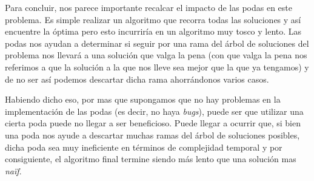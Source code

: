 Para concluir, nos parece importante recalcar el impacto de las podas en este problema. Es simple realizar un algoritmo que recorra todas las soluciones y así encuentre la óptima pero esto incurriría en un algoritmo muy tosco y lento. Las podas nos ayudan a determinar si seguir por una rama del árbol de soluciones del problema nos llevará a una solución que valga la pena (con que valga la pena nos referimos a que la solución a la que nos lleve sea mejor que la que ya tengamos) y de no ser así podemos descartar dicha rama ahorrándonos varios casos.

Habiendo dicho eso, por mas que supongamos que no hay problemas en la implementación de las podas (es decir, no haya \emph{bugs}), puede ser que utilizar una cierta poda puede no llegar a ser beneficioso. Puede llegar a ocurrir que, si bien una poda nos ayude a descartar muchas ramas del árbol de soluciones posibles, dicha poda sea muy ineficiente en términos de complejidad temporal y por consiguiente, el algoritmo final termine siendo más lento que una solución mas \emph{naïf}.